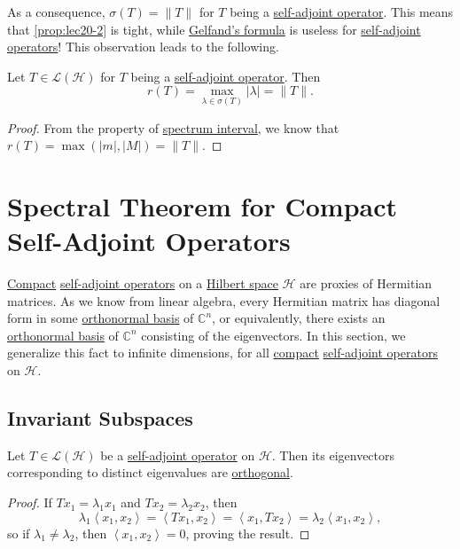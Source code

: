 As a consequence, \(\sigma (T) = \lVert T \rVert \) for \(T\) being a \hyperref[def:self-adjoint-op]{self-adjoint operator}. This means that \autoref{prop:lec20-2} is tight, while \hyperref[thm:Gelfand-formula]{Gelfand's formula} is useless for \hyperref[def:self-adjoint-op]{self-adjoint operators}! This observation leads to the following.

\begin{corollary}\label{col:spectral-radius}
	Let \(T\in \mathcal{L} (\mathcal{H} )\) for \(T\) being a \hyperref[def:self-adjoint-op]{self-adjoint operator}. Then
	\[
		r(T) = \max _{\lambda \in \sigma (T)} \vert \lambda \vert = \lVert T \rVert.
	\]
\end{corollary}
\begin{proof}
	From the property of \hyperref[thm:spectrum-interval]{spectrum interval}, we know that \(r(T) = \max (\vert m \vert , \vert M \vert ) = \lVert T \rVert\).
\end{proof}

\section{Spectral Theorem for Compact Self-Adjoint Operators}
\hyperref[def:compact-op]{Compact} \hyperref[def:self-adjoint-op]{self-adjoint operators} on a \hyperref[def:Hilbert-space]{Hilbert space} \(\mathcal{H} \) are proxies of Hermitian matrices. As we know from linear algebra, every Hermitian matrix has diagonal form in some \hyperref[def:orthonormal-basis]{orthonormal basis} of \(\mathbb{C} ^n\), or equivalently, there exists an \hyperref[def:orthonormal-basis]{orthonormal basis} of \(\mathbb{C} ^n\) consisting of the eigenvectors. In this section, we generalize this fact to infinite dimensions, for all \hyperref[def:compact-op]{compact} \hyperref[def:self-adjoint-op]{self-adjoint operators} on \(\mathcal{H} \).

\subsection{Invariant Subspaces}
\begin{proposition}\label{prop:eigenvectors-orthogonal}
	Let \(T\in \mathcal{L} (\mathcal{H} )\) be a \hyperref[def:self-adjoint-op]{self-adjoint operator} on \(\mathcal{H} \). Then its eigenvectors corresponding to distinct eigenvalues are \hyperref[def:orthogonal-system]{orthogonal}.
\end{proposition}
\begin{proof}
	If \(Tx_1 = \lambda _1 x_1\) and \(Tx_2 = \lambda _2 x_2\), then
	\[
		\lambda _1 \left\langle x_1, x_2 \right\rangle
		= \left\langle Tx_1, x_2 \right\rangle
		= \left\langle x_1, Tx_2 \right\rangle
		= \lambda _2 \left\langle x_1, x_2 \right\rangle,
	\]
	so if \(\lambda _1 \neq \lambda _2\), then \(\left\langle x_1, x_2 \right\rangle = 0\), proving the result.
\end{proof}

